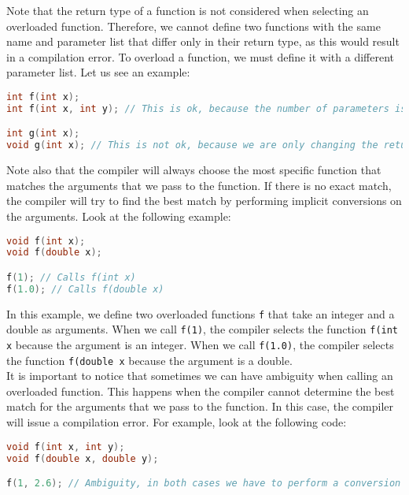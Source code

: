 Note that the return type of a function is not considered when selecting an overloaded
function. Therefore, we cannot define two functions with the same name and parameter
list that differ only in their return type, as this would result in a compilation error.
To overload a function, we must define it with a different parameter list. Let us see
an example:\\

\begin{lstlisting}[language=C++]
int f(int x);
int f(int x, int y); // This is ok, because the number of parameters is different

int g(int x);
void g(int x); // This is not ok, because we are only changing the return type
\end{lstlisting}

Note also that the compiler will always choose the most specific function that matches
the arguments that we pass to the function. If there is no exact match, the compiler
will try to find the best match by performing implicit conversions on the arguments.
Look at the following example:\\

\begin{lstlisting}[language=C++]
void f(int x);
void f(double x);

f(1); // Calls f(int x)
f(1.0); // Calls f(double x)
\end{lstlisting}

In this example, we define two overloaded functions \texttt{f} that take an integer
and a double as arguments. When we call \texttt{f(1)}, the compiler selects the function
\texttt{f(int x} because the argument is an integer. When we call \texttt{f(1.0)}, the
compiler selects the function \texttt{f(double x} because the argument is a double.\\

It is important to notice that sometimes we can have ambiguity when calling an overloaded
function. This happens when the compiler cannot determine the best match for the arguments
that we pass to the function. In this case, the compiler will issue a compilation error.
For example, look at the following code:\\

\begin{lstlisting}[language=C++]
void f(int x, int y);
void f(double x, double y);

f(1, 2.6); // Ambiguity, in both cases we have to perform a conversion
\end{lstlisting}

